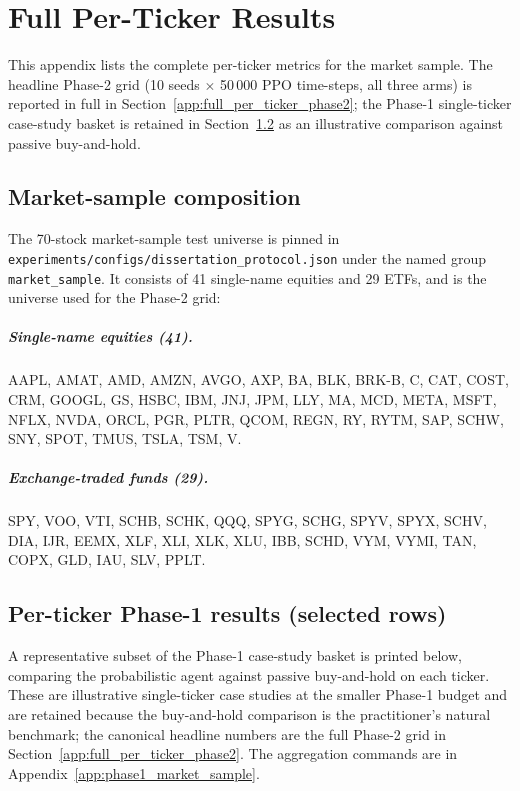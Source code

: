 \chapter{Full Per-Ticker Results}
\label{app:full_results}

This appendix lists the complete per-ticker metrics for the market sample. The headline Phase-2 grid (10 seeds $\times$ 50\,000 PPO time-steps, all three arms) is reported in full in Section~\ref{app:full_per_ticker_phase2}; the Phase-1 single-ticker case-study basket is retained in Section~\ref{app:per_ticker_phase1} as an illustrative comparison against passive buy-and-hold.

\section{Market-sample composition}
\label{app:market_sample_composition}

The 70-stock market-sample test universe is pinned in \texttt{experiments/configs/dissertation\_protocol.json} under the named group \texttt{market\_sample}. It consists of 41 single-name equities and 29 ETFs, and is the universe used for the Phase-2 grid:

\paragraph{Single-name equities (41).} AAPL, AMAT, AMD, AMZN, AVGO, AXP, BA, BLK, BRK-B, C, CAT, COST, CRM, GOOGL, GS, HSBC, IBM, JNJ, JPM, LLY, MA, MCD, META, MSFT, NFLX, NVDA, ORCL, PGR, PLTR, QCOM, REGN, RY, RYTM, SAP, SCHW, SNY, SPOT, TMUS, TSLA, TSM, V.

\paragraph{Exchange-traded funds (29).} SPY, VOO, VTI, SCHB, SCHK, QQQ, SPYG, SCHG, SPYV, SPYX, SCHV, DIA, IJR, EEMX, XLF, XLI, XLK, XLU, IBB, SCHD, VYM, VYMI, TAN, COPX, GLD, IAU, SLV, PPLT.

\section{Per-ticker Phase-1 results (selected rows)}
\label{app:per_ticker_phase1}

A representative subset of the Phase-1 case-study basket is printed below, comparing the probabilistic agent against passive buy-and-hold on each ticker. These are illustrative single-ticker case studies at the smaller Phase-1 budget and are retained because the buy-and-hold comparison is the practitioner's natural benchmark; the canonical headline numbers are the full Phase-2 grid in Section~\ref{app:full_per_ticker_phase2}. The aggregation commands are in Appendix~\ref{app:phase1_market_sample}.

